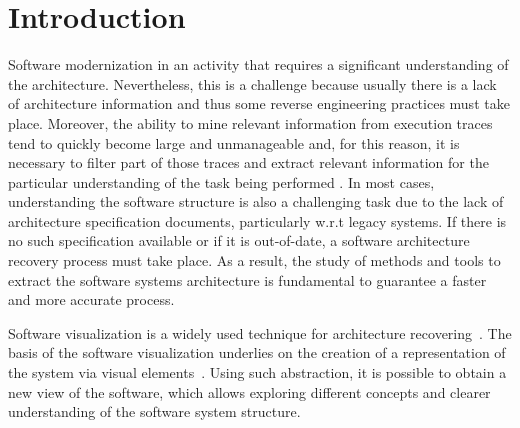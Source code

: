 \section{Introduction}

Software modernization in an activity that requires a significant understanding 
of the architecture. Nevertheless, this is a challenge because usually there is a 
lack of architecture information and thus some reverse engineering practices 
must take place. Moreover, the ability to mine relevant information from 
execution traces tend to quickly become large and unmanageable and, for this reason, 
it is necessary to filter part of those traces and extract relevant information 
for the particular understanding of the task being performed \cite{canfora_achievements_2011}. 
In most cases, understanding the software structure is also a challenging task due to the lack of 
architecture specification documents, particularly w.r.t legacy systems.  
If there is no such specification available or if it is out-of-date, a software architecture recovery 
process must take place.
As a result, the study of methods and tools to extract the software systems architecture is fundamental to guarantee a faster and more accurate process. 

Software visualization is a widely used technique for architecture recovering~\cite{ghanam_survey_2008, teyseyre_overview_2009, lanza_codecrawler-lessons_2003, Feijs_loe}. 
 The basis of the software visualization underlies 
on the creation of a representation of the system via visual elements~\cite{teyseyre_overview_2009}. 
Using such abstraction, it is possible to obtain a new view of the software, which allows exploring different concepts and 
clearer understanding of the software system structure.

